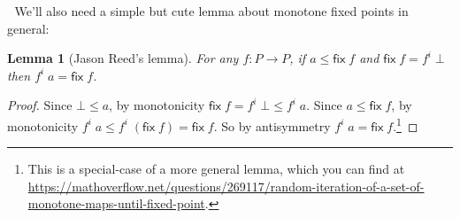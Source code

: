 \documentclass{article}
\newcommand{\ms}[1]{\ensuremath{\mathsf{#1}}}
\newtheorem{lemma}{Lemma}
\theoremstyle{definition}
\newcommand{\fix}{\ms{fix}}
\newcommand{\dv}{\delta}
\begin{document}





We'll also need a simple but cute lemma about monotone fixed points in general:

\begin{lemma}[Jason Reed's lemma] \label{lem:jcreed}
  For any $f : P \to P$, if $a \le \fix\;f$ and $\fix\;f = f^i\;\bot$ then
  $f^i\;a = \fix\;f$.
\end{lemma}
\begin{proof}
  Since $\bot \le a$, by monotonicity $\fix\;f = f^i\;\bot \le f^i\;a$. Since $a
  \le \fix\;f$, by monotonicity $f^i\;a \le f^i\;(\fix\;f) = \fix\;f$. So by
  antisymmetry $f^i\;a = \fix\;f$.\footnote{This is a special-case of a more general lemma, which you can find at \url{https://mathoverflow.net/questions/269117/random-iteration-of-a-set-of-monotone-maps-until-fixed-point}.}
\end{proof}
\end{document}
